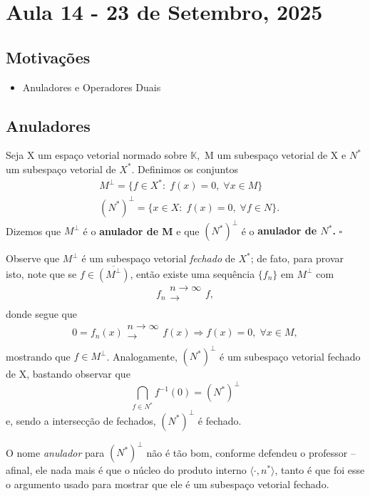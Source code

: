 \documentclass[../functional_analysis.tex]{subfiles}
\begin{document}
\section{Aula 14 - 23 de Setembro, 2025}
\subsection{Motivações}
\begin{itemize}
	\item Anuladores e Operadores Duais
\end{itemize}
\subsection{Anuladores}
\begin{def*}
	Seja X um espaço vetorial normado sobre \(\mathbb{K},\) M um subespaço vetorial de X e \(N^{*}\) um subespaço vetorial de \(X^{*}.\) Definimos os conjuntos
	\begin{align*}
		 & M^{\perp } = \{f\in X^{*}:\; f(x) = 0,\; \forall x\in M\}    \\
		 & (N^{*})^{\perp } = \{x\in X:\; f(x) = 0,\; \forall f\in N\}.
	\end{align*}
	Dizemos que \(M^{\perp }\) é o \textbf{anulador de M} e que \((N^{*})^{\perp }\) é o \textbf{anulador de \(N^{*}\).} \(\square\)
\end{def*}
Observe que \(M^{\perp }\) é um subespaço vetorial \textit{fechado} de \(X^{*}\); de fato, para provar isto, note que se \(f\in \overline{(M^{\perp })}\), então existe uma sequência \(\{f_{n}\}\) em \(M^{\perp }\) com
\[
	f_{n}\substack{n\to \infty \\ \longrightarrow \\ }f,
\]
donde segue que
\[
	0 = f_{n}(x)\substack{n\to \infty \\ \longrightarrow \\ }f(x) \Rightarrow f(x) = 0,\; \forall x\in M,
\]
mostrando que \(f\in M^{\perp }\). Analogamente, \((N^{*})^{\perp }\) é um subespaço vetorial fechado de X, bastando observar que
\[
	\bigcap_{f\in N^{*}}^{}f^{-1}(0) = (N^{*})^{\perp}
\]
e, sendo a intersecção de fechados, \((N^{*})^{\perp }\) é fechado.

\begin{tcolorbox}[
		skin=enhanced,
		title=Observação,
		fonttitle=\bfseries,
		colframe=black,
		colbacktitle=cyan!75!white,
		colback=cyan!15,
		colbacklower=black,
		coltitle=black,
		drop fuzzy shadow,
	]
	O nome \textit{anulador} para \((N^{*})^{\perp }\) não é tão bom, conforme defendeu o professor -- afinal, ele nada mais é que o núcleo do produto interno \(\langle \cdot , n^{*} \rangle\), tanto é
	que foi esse o argumento usado para mostrar que ele	é um subespaço vetorial fechado.
\end{tcolorbox}
\end{document}

